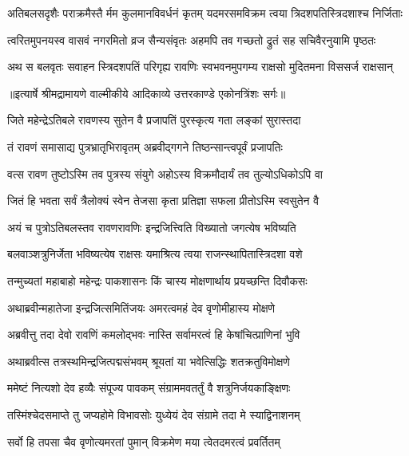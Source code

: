 \fourlineindentedshloka
{अतिबलसदृशैः पराक्रमैस्तै}
{र्मम कुलमानविवर्धनं कृतम्}
{यदमरसमविक्रम त्वया}
{ त्रिदशपतिस्त्रिदशाश्च निर्जिताः} %

\fourlineindentedshloka
{त्वरितमुपनयस्व वासवं}
{ नगरमितो व्रज सैन्यसंवृतः}
{अहमपि तव गच्छतो द्रुतं}
{ सह सचिवैरनुयामि पृष्ठतः} %

\fourlineindentedshloka
{अथ स बलवृतः सवाहन}
{स्त्रिदशपतिं परिगृह्य रावणिः}
{स्वभवनमुपगम्य राक्षसो}
{ मुदितमना विससर्ज राक्षसान्} %


{॥इत्यार्षे श्रीमद्रामायणे वाल्मीकीये आदिकाव्ये उत्तरकाण्डे एकोनत्रिंशः सर्गः॥}


\twolineshloka
{जिते महेन्द्रेऽतिबले रावणस्य सुतेन वै}
{प्रजापतिं पुरस्कृत्य गता लङ्कां सुरास्तदा} %

\twolineshloka
{तं रावणं समासाद्य पुत्रभ्रातृभिरावृतम्}
{अब्रवीद्गगने तिष्ठन्सान्त्वपूर्वं प्रजापतिः} %

\twolineshloka
{वत्स रावण तुष्टोऽस्मि तव पुत्रस्य संयुगे}
{अहोऽस्य विक्रमौदार्यं तव तुल्योऽधिकोऽपि वा} %

\twolineshloka
{जितं हि भवता सर्वं त्रैलोक्यं स्वेन तेजसा}
{कृता प्रतिज्ञा सफला प्रीतोऽस्मि स्वसुतेन वै} %

\twolineshloka
{अयं च पुत्रोऽतिबलस्तव रावणरावणिः}
{इन्द्रजित्त्विति विख्यातो जगत्येष भविष्यति} %

\twolineshloka
{बलवाञ्शत्रुनिर्जेता भविष्यत्येष राक्षसः}
{यमाश्रित्य त्वया राजन्स्थापितास्त्रिदशा वशे} %

\twolineshloka
{तन्मुच्यतां महाबाहो महेन्द्रः पाकशासनः}
{किं चास्य मोक्षणार्थाय प्रयच्छन्ति दिवौकसः} %

\twolineshloka
{अथाब्रवीन्महातेजा इन्द्रजित्समितिंजयः}
{अमरत्वमहं देव वृणोमीहास्य मोक्षणे} %

\twolineshloka
{अब्रवीत्तु तदा देवो रावणिं कमलोद्भवः}
{नास्ति सर्वामरत्वं हि केषांचित्प्राणिनां भुवि} %

\twolineshloka
{अथाब्रवीत्स तत्रस्थमिन्द्रजित्पद्मसंभवम्}
{श्रूयतां या भवेत्सिद्धिः शतक्रतुविमोक्षणे} %

\twolineshloka
{ममेष्टं नित्यशो देव हव्यैः संपूज्य पावकम्}
{संग्राममवतर्तुं वै शत्रुनिर्जयकाङ्क्षिणः} %

\twolineshloka
{तस्मिंश्चेदसमाप्ते तु जप्यहोमे विभावसोः}
{युध्येयं देव संग्रामे तदा मे स्याद्विनाशनम्} %

\twolineshloka
{सर्वो हि तपसा चैव वृणोत्यमरतां पुमान्}
{विक्रमेण मया त्वेतदमरत्वं प्रवर्तितम्} %

